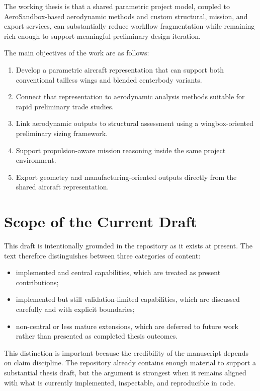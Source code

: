 \documentclass[12pt]{report}
\begin{document}
The working thesis is that a shared parametric project model, coupled to AeroSandbox-based aerodynamic methods and custom structural, mission, and export services, can substantially reduce workflow fragmentation while remaining rich enough to support meaningful preliminary design iteration.

The main objectives of the work are as follows:
\begin{enumerate}[label=\arabic*.]
\item Develop a parametric aircraft representation that can support both conventional tailless wings and blended centerbody variants.
\item Connect that representation to aerodynamic analysis methods suitable for rapid preliminary trade studies.
\item Link aerodynamic outputs to structural assessment using a wingbox-oriented preliminary sizing framework.
\item Support propulsion-aware mission reasoning inside the same project environment.
\item Export geometry and manufacturing-oriented outputs directly from the shared aircraft representation.
\end{enumerate}

\section{Scope of the Current Draft}
This draft is intentionally grounded in the repository as it exists at present. The text therefore distinguishes between three categories of content:
\begin{itemize}
\item implemented and central capabilities, which are treated as present contributions;
\item implemented but still validation-limited capabilities, which are discussed carefully and with explicit boundaries;
\item non-central or less mature extensions, which are deferred to future work rather than presented as completed thesis outcomes.
\end{itemize}

This distinction is important because the credibility of the manuscript depends on claim discipline. The repository already contains enough material to support a substantial thesis draft, but the argument is strongest when it remains aligned with what is currently implemented, inspectable, and reproducible in code.
\end{document}
